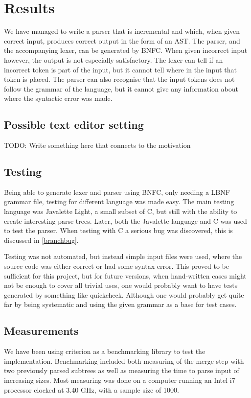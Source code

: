 \documentclass[a4paper,12pt,twosided]{report}
\begin{document}
%
%

\chapter{Results}
We have managed to write a parser that is incremental and which, when given
correct input, produces correct output in the form of an AST. The parser, and
the accompanying lexer, can be generated by BNFC. When given incorrect input
however, the output is not especially satisfactory. The lexer can tell if an
incorrect token is part of the input, but it cannot tell where in the input that
token is placed. The parser can also recognise that the input tokens does not
follow the grammar of the language, but it cannot give any information about
where the syntactic error was made.

\section{Possible text editor setting}
TODO: Write something here that connects to the motivation

\section{Testing}
Being able to generate lexer and parser using BNFC, only needing a LBNF grammar
file, testing for different language was made easy. The main testing language
was Javalette Light, a small subset of C, but still with the ability to create
interesting parse trees. Later, both the Javalette language and C was used to
test the parser. When testing with C a serious bug was discovered, this is
discussed in \ref{branchbug}.

Testing was not automated, but instead simple input files were used, where the
source code was either correct or had some syntax error. This proved to be
sufficient for this project, but for future versions, when hand-written cases
might not be enough to cover all trivial uses, one would probably want to have
tests generated by something like quickcheck. Although one would probably get
quite far by being systematic and using the given grammar as a base for test
cases. 

\section{Measurements}
We have been using criterion as a benchmarking library to test the
implementation. Benchmarking included both measuring of the merge step with two
previously parsed subtrees as well as measuring the time to parse input of
increasing sizes. Most measuring was done on a computer running an Intel i7
processor clocked at 3.40 GHz, with a sample size of 1000. 
\end{document}
